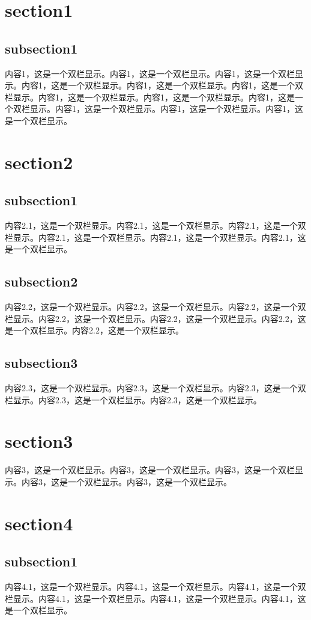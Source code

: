 \documentclass[a4pper]{article}
\begin{document}
\begin{multicols}{2}
\section{section1}
    \subsection{subsection1}
    内容1，这是一个双栏显示。内容1，这是一个双栏显示。内容1，这是一个双栏显示。内容1，这是一个双栏显示。内容1，这是一个双栏显示。内容1，这是一个双栏显示。内容1，这是一个双栏显示。内容1，这是一个双栏显示。内容1，这是一个双栏显示。内容1，这是一个双栏显示。内容1，这是一个双栏显示。内容1，这是一个双栏显示。


\section{section2}
    \subsection{subsection1}
    内容2.1，这是一个双栏显示。内容2.1，这是一个双栏显示。内容2.1，这是一个双栏显示。内容2.1，这是一个双栏显示。内容2.1，这是一个双栏显示。内容2.1，这是一个双栏显示。
    \subsection{subsection2}
    内容2.2，这是一个双栏显示。内容2.2，这是一个双栏显示。内容2.2，这是一个双栏显示。内容2.2，这是一个双栏显示。内容2.2，这是一个双栏显示。内容2.2，这是一个双栏显示。内容2.2，这是一个双栏显示。
    \subsection{subsection3}
    内容2.3，这是一个双栏显示。内容2.3，这是一个双栏显示。内容2.3，这是一个双栏显示。内容2.3，这是一个双栏显示。内容2.3，这是一个双栏显示。

\section{section3}
    内容3，这是一个双栏显示。内容3，这是一个双栏显示。内容3，这是一个双栏显示。内容3，这是一个双栏显示。内容3，这是一个双栏显示。

\section{section4}
    \subsection{subsection1}
    内容4.1，这是一个双栏显示。内容4.1，这是一个双栏显示。内容4.1，这是一个双栏显示。内容4.1，这是一个双栏显示。内容4.1，这是一个双栏显示。内容4.1，这是一个双栏显示。

\end{multicols}
\end{document}
